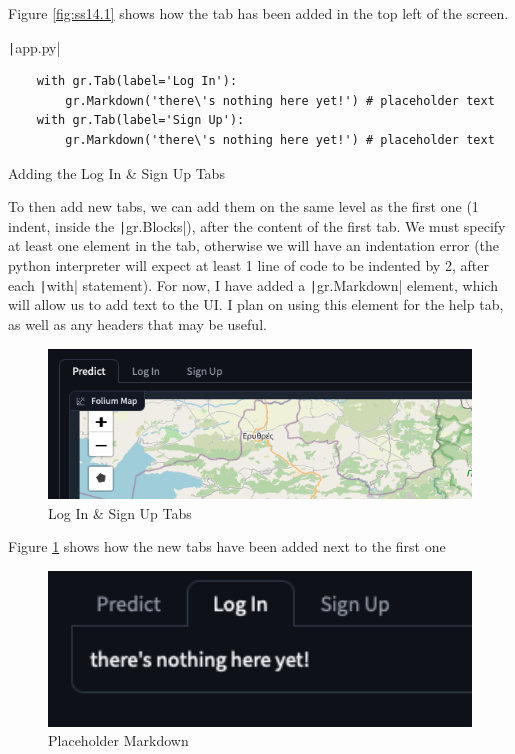 \documentclass[12pt]{report}
\newcommand{\pil}[1]{\protect\texttt|#1|}
\begin{document}
Figure \ref{fig:ss14.1} shows how the tab has been added in the top left of the screen.

\begin{listing}[H]
\pil{app.py}
\begin{verbatim}
    with gr.Tab(label='Log In'):
        gr.Markdown('there\'s nothing here yet!') # placeholder text
    with gr.Tab(label='Sign Up'):
        gr.Markdown('there\'s nothing here yet!') # placeholder text
\end{verbatim}
\caption{Adding the Log In \& Sign Up Tabs}\label{cs:logInSignUpTabs}
\end{listing}

To then add new tabs, we can add them on the same level as the first one (1 indent, inside the \pil{gr.Blocks}), after the content of the first tab. We must specify at least one element in the tab, otherwise we will have an indentation error (the python interpreter will expect at least 1 line of code to be indented by 2, after each \pil{with} statement). For now, I have added a \pil{gr.Markdown} element, which will allow us to add text to the UI. I plan on using this element for the help tab, as well as any headers that may be useful.

\begin{figure}[H]
\centering
\includegraphics[width=12cm]{ss14.2.png}
\caption{Log In \& Sign Up Tabs}\label{fig:ss14.2}
\end{figure}

Figure \ref{fig:ss14.2} shows how the new tabs have been added next to the first one

\begin{figure}[H]
\centering
\includegraphics[width=12cm]{ss14.3.png}
\caption{Placeholder Markdown}\label{fig:ss14.3}
\end{figure}
\end{document}

